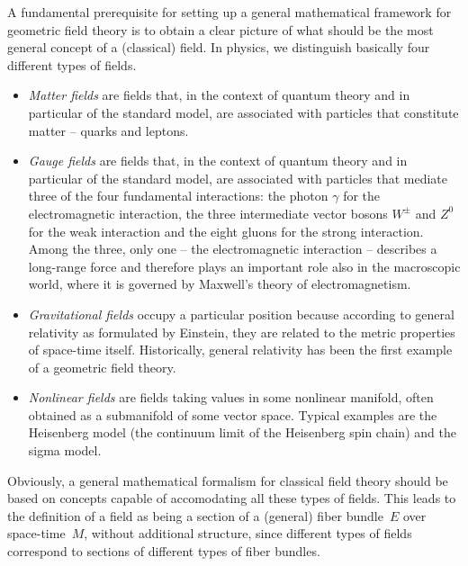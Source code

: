 \documentclass[a4paper,12pt,fleqn]{article}  %
\begin{document}
A fundamental prerequisite for setting up a general mathematical framework
for geo\-metric field theory is to obtain a clear picture of what should be
the most general concept of a (classical) field. In physics, we distinguish
basically four different types of fields.
\begin{itemize}
 \item \emph{Matter fields} are fields that, in the context of quantum theory
       and in particular of the standard model, are associated with particles
       that constitute matter -- quarks and leptons.
 \item \emph{Gauge fields} are fields that, in the context of quantum theory
       and in particular of the standard model, are associated with particles
       that mediate three of the four fundamental interactions: the photon
       $\gamma$ for the electromagnetic interaction, the three intermediate
       vector bosons $W^\pm$ and $Z^0$ for the weak interaction and the
       eight gluons for the strong interaction. Among the three, only
       one -- the electromagnetic interaction -- describes a long-range
       force and therefore plays an important role also in the macroscopic
       world, where it is governed by Maxwell's theory of electromagnetism.
 \item \emph{Gravitational fields} occupy a particular position because
       according to general relativity as formulated by Einstein, they
       are related to the metric properties of space-time itself.
       Historically, general relativity has been the first example
       of a geometric field theory.
 \item \emph{Nonlinear fields} are fields taking values in some nonlinear
       manifold, often obtained as a submanifold of some vector space.
       Typical examples are the Heisenberg model (the continuum limit
       of the Heisenberg spin chain) and the sigma model.
\end{itemize}
Obviously, a general mathematical formalism for classical field theory
should be based on concepts capable of accomodating all these types of
fields. This leads to the definition of a field as being a section of
a (general) fiber bundle~$E$ over space-time~$M$, without additional
structure, since different types of fields correspond to sections of
different types of fiber bundles.
\end{document}
